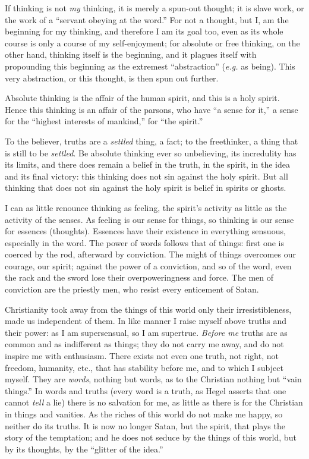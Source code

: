 If thinking is not \textit{my} thinking, it is merely a spun-out thought; it 
is slave work, or the work of a ``servant obeying at the word.'' For not a 
thought, but I, am the beginning for my thinking, and therefore I am its goal 
too, even as its whole course is only a course of my self-enjoyment; for 
absolute or free thinking, on the other hand, thinking itself is the 
beginning, and it plagues itself with propounding this beginning as the 
extremest ``abstraction'' (\textit{e.g.} as being). This very abstraction, 
or this thought, is then spun out further.

Absolute thinking is the affair of the human spirit, and this is a holy 
spirit. Hence this thinking is an affair of the parsons, who have ``a sense 
for it,'' a sense for the ``highest interests of mankind,'' for ``the 
spirit.''

To the believer, truths are a \textit{settled} thing, a fact; to the 
freethinker, a thing that is still to be \textit{settled}. Be absolute 
thinking ever so unbelieving, its incredulity has its limits, and there does 
remain a belief in the truth, in the spirit, in the idea and its final 
victory: this thinking does not sin against the holy spirit. But all thinking 
that does not sin against the holy spirit is belief in spirits or ghosts.

I can as little renounce thinking as feeling, the spirit's activity as little 
as the activity of the senses. As feeling is our sense for things, so thinking 
is our sense for essences (thoughts). Essences have their existence in 
everything sensuous, especially in the word. The power of words follows that 
of things: first one is coerced by the rod, afterward by conviction. The might 
of things overcomes our courage, our spirit; against the power of a 
conviction, and so of the word, even the rack and the sword lose their 
overpoweringness and force. The men of conviction are the priestly men, who 
resist every enticement of Satan.

Christianity took away from the things of this world only their 
irresistibleness, made us independent of them. In like manner I raise myself 
above truths and their power: as I am supersensual, so I am supertrue. 
\textit{Before me} truths are as common and as indifferent as things; they do 
not carry me away, and do not inspire me with enthusiasm. There exists not 
even one truth, not right, not freedom, humanity, etc., that has stability 
before me, and to which I subject myself. They are \textit{words}, nothing but 
words, as to the Christian nothing but ``vain things.'' In words and truths 
(every word is a truth, as Hegel asserts that one cannot \textit{tell} a lie) 
there is no salvation for me, as little as there is for the Christian in 
things and vanities. As the riches of this world do not make me happy, so 
neither do its truths. It is now no longer Satan, but the spirit, that plays 
the story of the temptation; and he does not seduce by the things of this 
world, but by its thoughts, by the ``glitter of the idea.''

